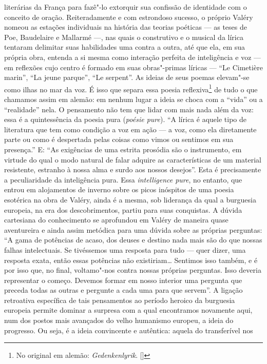 literárias da França para fazê"-lo extorquir sua confissão de identidade
com o conceito de oração. Reiteradamente e com estrondoso sucesso, o
próprio Valéry nomeou as estações individuais na história das teorias
poéticas --- as teses de Poe, Baudelaire e Mallarmé ---, nas quais o
construtivo e o musical da lírica tentaram delimitar suas habilidades
uma contra a outra, até que ela, em sua própria obra, entenda a si mesma
como interação perfeita de inteligência e voz --- em reflexões cujo centro
é formado em suas obras"-primas líricas --- ``Le Cimetière marin'', ``La jeune
parque'', ``Le serpent''. As ideias de seus poemas elevam"-se como ilhas no
mar da voz. É isso que separa essa poesia reflexiva\footnote{No original em alemão: \emph{Gedenkenlyrik}. []}
de tudo o que chamamos assim em alemão: em nenhum
lugar a ideia se choca com a ``vida'' ou a ``realidade'' nela. O pensamento
não tem que lidar com mais nada além da voz: essa é a quintessência da
poesia pura (\emph{poésie pure}). ``A lírica é aquele tipo de literatura
que tem como condição a voz em ação --- a voz, como ela diretamente parte
ou como é despertada pelas coisas como vimos ou sentimos em sua
presença.'' E: ``As exigências de uma estrita prosódia são o instrumento, em
virtude do qual o modo natural de falar adquire as características de um
material resistente, estranho à nossa alma e surdo aos nossos desejos''.
Esta é precisamente a peculiaridade da inteligência pura. Essa
\emph{intelligence pure}, no entanto, que entrou em alojamentos de
inverno sobre os picos inóspitos de uma poesia esotérica na obra de
Valéry, ainda é a mesma, sob liderança da qual a burguesia europeia, na
era dos descobrimentos, partiu para suas conquistas. A dúvida cartesiana
do conhecimento se aprofundou em Valéry de maneira quase aventureira e
ainda assim metódica para uma dúvida sobre as próprias perguntas: ``A
gama de potências de acaso, dos deuses e destino nada mais são do que
nossas falhas intelectuais. Se tivéssemos uma resposta para tudo ---
quer dizer, uma resposta exata, então essas potências não existiriam\ldots{}
Sentimos isso também, e é por isso que, no final, voltamo"-nos contra
nossas próprias perguntas. Isso deveria representar o começo. Devemos
formar em nosso interior uma pergunta que preceda todas as outras e
pergunte a cada uma para que servem''. A ligação retroativa específica
de tais pensamentos ao período heroico da burguesia europeia permite
dominar a surpresa com a qual encontramos novamente aqui, num dos postos
mais avançados do velho humanismo europeu, a ideia do progresso. Ou
seja, é a ideia convincente e autêntica: aquela do transferível nos

